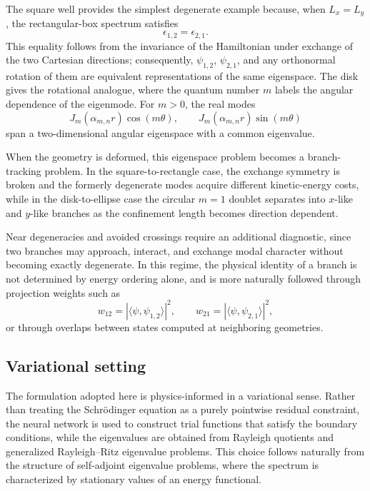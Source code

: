 \documentclass[10pt,onecolumn]{article}
\begin{document}
The square well provides the simplest degenerate example because, when $L_x=L_y$, the rectangular-box spectrum satisfies
\begin{equation}
\epsilon_{1,2}=\epsilon_{2,1}.
\end{equation}
This equality follows from the invariance of the Hamiltonian under exchange of the two Cartesian directions; consequently, $\psi_{1,2}$, $\psi_{2,1}$, and any orthonormal rotation of them are equivalent representations of the same eigenspace. The disk gives the rotational analogue, where the quantum number $m$ labels the angular dependence of the eigenmode. For $m>0$, the real modes
\begin{equation}
J_m(\alpha_{m,n}r)\cos(m\theta),
\qquad
J_m(\alpha_{m,n}r)\sin(m\theta)
\end{equation}
span a two-dimensional angular eigenspace with a common eigenvalue.

When the geometry is deformed, this eigenspace problem becomes a branch-tracking problem. In the square-to-rectangle case, the exchange symmetry is broken and the formerly degenerate modes acquire different kinetic-energy costs, while in the disk-to-ellipse case the circular $m=1$ doublet separates into $x$-like and $y$-like branches as the confinement length becomes direction dependent.

Near degeneracies and avoided crossings require an additional diagnostic, since two branches may approach, interact, and exchange modal character without becoming exactly degenerate. In this regime, the physical identity of a branch is not determined by energy ordering alone, and is more naturally followed through projection weights such as
\begin{equation}
w_{12}=|\langle \psi,\psi_{1,2}\rangle|^2,
\qquad
w_{21}=|\langle \psi,\psi_{2,1}\rangle|^2,
\end{equation}
or through overlaps between states computed at neighboring geometries.

\subsection{Variational setting}

The formulation adopted here is physics-informed in a variational sense. Rather than treating the Schrödinger equation as a purely pointwise residual constraint, the neural network is used to construct trial functions that satisfy the boundary conditions, while the eigenvalues are obtained from Rayleigh quotients and generalized Rayleigh--Ritz eigenvalue problems. This choice follows naturally from the structure of self-adjoint eigenvalue problems, where the spectrum is characterized by stationary values of an energy functional.
\end{document}

